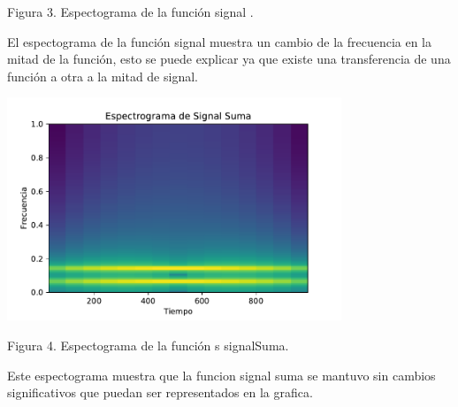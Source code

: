 \documentclass{article}
\begin{document}
\begin{center}
Figura 3. Espectograma de la función signal .
\begin{flushleft}
El espectograma de la función signal muestra un cambio de la frecuencia en la mitad de la función, esto se puede explicar ya que existe una transferencia de una función a otra a la mitad de  signal.
\end{flushleft}
\includegraphics[width=10cm]{GarzonCamilo_espectograma_signalSuma.pdf} 


Figura 4. Espectograma de la función s signalSuma.

\begin{flushleft}
Este espectograma muestra que la funcion signal suma se mantuvo sin cambios significativos que puedan ser representados en la grafica.
\end{flushleft}
\end{center}
\vspace{5mm}
\end{document}
